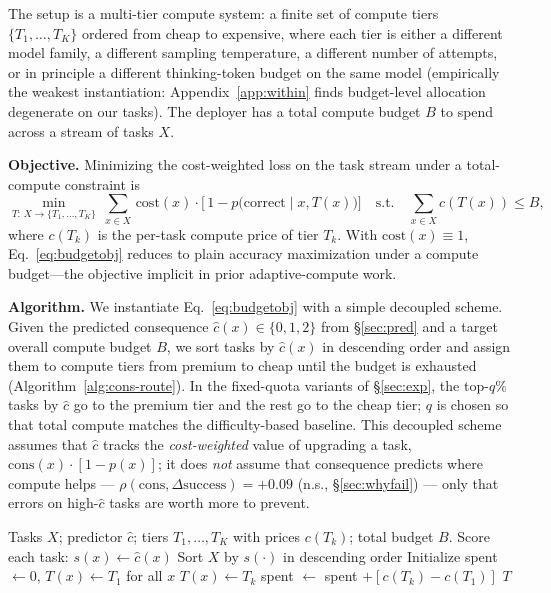 \documentclass{article}
\begin{document}
The setup is a multi-tier compute system: a finite set of compute tiers $\{T_1, \ldots, T_K\}$ ordered from cheap to expensive, where each tier is either a different model family, a different sampling temperature, a different number of attempts, or in principle a different thinking-token budget on the same model (empirically the weakest instantiation: Appendix~\ref{app:within} finds budget-level allocation degenerate on our tasks). The deployer has a total compute budget $B$ to spend across a stream of tasks $X$.

\textbf{Objective.} Minimizing the cost-weighted loss on the task stream under a total-compute constraint is
\begin{equation}\label{eq:budgetobj}
\min_{T:\,X\to\{T_1,\dots,T_K\}}\ \sum_{x\in X}\, \mathrm{cost}(x)\cdot
\bigl[\,1 - p\bigl(\text{correct}\mid x, T(x)\bigr)\bigr]
\quad\text{s.t.}\quad
\sum_{x\in X} c(T(x)) \leq B,
\end{equation}
where $c(T_k)$ is the per-task compute price of tier $T_k$. With
$\mathrm{cost}(x){\equiv}1$, Eq.~\ref{eq:budgetobj} reduces to plain
accuracy maximization under a compute budget---the objective implicit in prior adaptive-compute work.

\textbf{Algorithm.} We instantiate Eq.~\ref{eq:budgetobj} with a simple decoupled scheme. Given the predicted consequence $\hat{c}(x) \in \{0,1,2\}$ from \S\ref{sec:pred} and a target overall
compute budget $B$, we sort tasks by $\hat{c}(x)$ in descending order and assign them to compute tiers from premium to cheap until the
budget is exhausted (Algorithm~\ref{alg:cons-route}). In the fixed-quota variants of \S\ref{sec:exp}, the top-$q\%$ tasks by
$\hat{c}$ go to the premium tier and the rest go to the cheap tier;
$q$ is chosen so that total compute matches the difficulty-based baseline. This decoupled scheme assumes that $\hat{c}$ tracks the
\emph{cost-weighted} value of upgrading a task,
$\mathrm{cons}(x)\cdot[1 - p(x)]$; it does \emph{not} assume that
consequence predicts where compute helps ---
$\rho(\mathrm{cons}, \Delta\mathrm{success}) = +0.09$ (n.s.,
\S\ref{sec:whyfail}) --- only that errors on high-$\hat{c}$ tasks
are worth more to prevent.

\begin{algorithm}
\caption{Cost-weighted compute allocation}\label{alg:cons-route}
\begin{algorithmic}[1]
\REQUIRE Tasks $X$; predictor $\hat{c}$; tiers $T_1, \ldots, T_K$ with prices $c(T_k)$; total budget $B$.
\STATE Score each task: $s(x) \leftarrow \hat{c}(x)$
\STATE Sort $X$ by $s(\cdot)$ in descending order
\STATE Initialize spent $\leftarrow 0$, $T(x) \leftarrow T_1$ for all $x$
      \STATE $T(x) \leftarrow T_k$
      \STATE spent $\leftarrow$ spent $+ [c(T_k) - c(T_1)]$
    \ENDIF
  \ENDFOR
\ENDFOR
\RETURN $T$
\end{algorithmic}
\end{algorithm}
\end{document}

